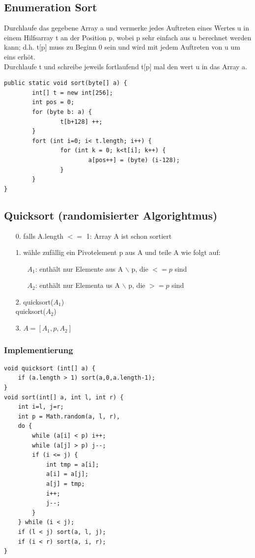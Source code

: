 \documentclass[a4paper,10pt]{article}
\begin{document}
\subsection{Enumeration Sort}
Durchlaufe das gegebene Array a und vermerke jedes Auftreten eines Wertes u in einem Hilfsarray t an der Position p, wobei p sehr einfach aus u berechnet werden kann; d.h. t[p] muss zu Beginn 0 sein und wird mit jedem Auftreten von u um eins erh\"ot. \\
Durchlaufe t und schreibe jeweils fortlaufend t[p] mal den wert u  in das Array a.
\begin{lstlisting}
public static void sort(byte[] a) {
		int[] t = new int[256];
		int pos = 0;
		for (byte b: a) {
				t[b+128] ++;
		}
		fort (int i=0; i< t.length; i++) {
				for (int k = 0; k<t[i]; k++) {
						a[pos++] = (byte) (i-128);
				}
		}
}
\end{lstlisting}

\subsection{Quicksort (randomisierter Algorightmus)}
\begin{itemize}
	\item[0.] falls A.length $<=$ 1: Array A ist schon sortiert
	\item[1.] w\"ahle zuf\"allig ein Pivotelement p aus A und teile A wie folgt auf:
		\begin{itemize}
			\item[$A_1$:] enth\"alt nur Elemente aus A $\backslash$ p, die $<= p$ sind
			\item[$A_2$:] enth\"alt nur Elementa us A $\backslash$ p, die $>= p$ sind 
		\end{itemize}
	\item[2.] quicksort($A_1$) \\
		quicksort($A_2$)
	\item[3.] $A = [A_1, p, A_2]$
\end{itemize}
\subsubsection{Implementierung}
\begin{lstlisting}
void quicksort (int[] a) {
	if (a.length > 1) sort(a,0,a.length-1);
}
void sort(int[] a, int l, int r) {
	int i=l, j=r;
	int p = Math.random(a, l, r),
	do {
		while (a[i] < p) i++;
		while (a[j] > p) j--;
		if (i <= j) {
			int tmp = a[i];
			a[i] = a[j];
			a[j] = tmp;
			i++;
			j--;
		}
	} while (i < j);
	if (l < j) sort(a, l, j);
	if (i < r) sort(a, i, r);
}
\end{lstlisting}
\end{document}
